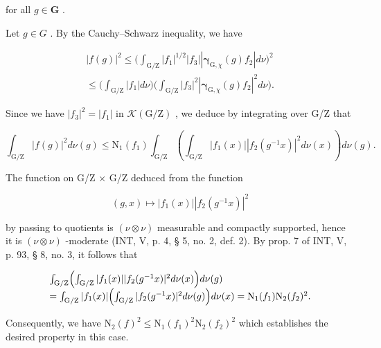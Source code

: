 for all \(g \in \mathbf{G}\) .

 Let \(g \in G\) . By the Cauchy--Schwarz inequality, we have

\[
\begin{array}{l} | f (g) | ^ {2} \leqslant \Big (\int_ {\mathrm{G/Z}} | f _ {1} | ^ {1 / 2} | f _ {3} | | \boldsymbol {\gamma} _ {\mathrm{G}, \chi} (g) f _ {2} | d \nu \Big) ^ {2} \\ \leqslant \Big (\int_ {\mathrm{G/Z}} | f _ {1} | d \nu \Big) \Big (\int_ {\mathrm{G/Z}} | f _ {3} | ^ {2} | \boldsymbol {\gamma} _ {\mathrm{G}, \chi} (g) f _ {2} | ^ {2} d \nu \Big). \end{array}
\]

Since we have \(|f_{3}|^{2}=|f_{1}|\) in \(\mathcal{K}(\mathrm{G}/\mathrm{Z})\) , we deduce by integrating over G/Z that

\[
\int_ {\mathrm{G} / \mathrm{Z}} | f (g) | ^ {2} d \nu (g) \leqslant \mathrm{N} _ {1} (f _ {1}) \int_ {\mathrm{G} / \mathrm{Z}} \left(\int_ {\mathrm{G} / \mathrm{Z}} | f _ {1} (x) | | f _ {2} (g ^ {- 1} x) | ^ {2} d \nu (x)\right) d \nu (g).
\]

The function on G/Z × G/Z deduced from the function

\[
(g, x) \mapsto | f _ {1} (x) | | f _ {2} (g ^ {- 1} x) | ^ {2}
\]

by passing to quotients is \((\nu \otimes \nu)\) measurable and compactly supported, hence it is \((\nu \otimes \nu)\) -moderate (INT, V, p. 4, § 5, no. 2, def. 2). By prop. 7 of INT, V, p. 93, § 8, no. 3, it follows that

\[
\begin{array}{l} \int_ {\mathrm{G} / \mathrm{Z}} \Bigl (\int_ {\mathrm{G} / \mathrm{Z}} | f _ {1} (x) |   | f _ {2} (g ^ {- 1} x) | ^ {2} d \nu (x) \Bigr) d \nu (g) \\ = \int_ {\mathrm{G} / \mathrm{Z}} | f _ {1} (x) | \Bigl (\int_ {\mathrm{G} / \mathrm{Z}} | f _ {2} (g ^ {- 1} x) | ^ {2} d \nu (g) \Bigr) d \nu (x) = \mathrm{N} _ {1} (f _ {1}) \mathrm{N} _ {2} (f _ {2}) ^ {2}. \end{array}
\]

Consequently, we have \(\mathrm{N}_{2}(f)^{2}\leqslant\mathrm{N}_{1}(f_{1})^{2}\mathrm{N}_{2}(f_{2})^{2}\) which establishes the desired property in this case.

